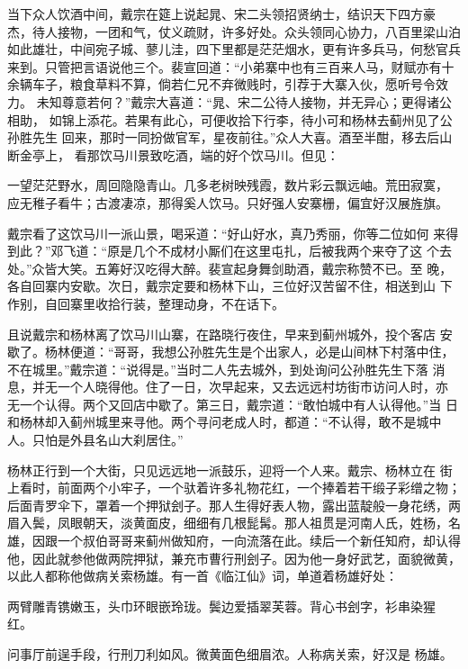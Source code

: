 当下众人饮酒中间，戴宗在筵上说起晁、宋二头领招贤纳士，结识天下四方豪
杰，待人接物，一团和气，仗义疏财，许多好处。众头领同心协力，八百里梁山泊
如此雄壮，中间宛子城、蓼儿洼，四下里都是茫茫烟水，更有许多兵马，何愁官兵
来到。只管把言语说他三个。裴宣回道：“小弟寨中也有三百来人马，财赋亦有十
余辆车子，粮食草料不算，倘若仁兄不弃微贱时，引荐于大寨入伙，愿听号令效力。
未知尊意若何？”戴宗大喜道：“晁、宋二公待人接物，并无异心；更得诸公相助，
如锦上添花。若果有此心，可便收拾下行李，待小可和杨林去蓟州见了公孙胜先生
回来，那时一同扮做官军，星夜前往。”众人大喜。酒至半酣，移去后山断金亭上，
看那饮马川景致吃酒，端的好个饮马川。但见：

一望茫茫野水，周回隐隐青山。几多老树映残霞，数片彩云飘远岫。荒田寂寞，
应无稚子看牛；古渡凄凉，那得奚人饮马。只好强人安寨栅，偏宜好汉展旌旗。

戴宗看了这饮马川一派山景，喝采道：“好山好水，真乃秀丽，你等二位如何
来得到此？”邓飞道：“原是几个不成材小厮们在这里屯扎，后被我两个来夺了这
个去处。”众皆大笑。五筹好汉吃得大醉。裴宣起身舞剑助酒，戴宗称赞不已。至
晚，各自回寨内安歇。次日，戴宗定要和杨林下山，三位好汉苦留不住，相送到山
下作别，自回寨里收拾行装，整理动身，不在话下。

且说戴宗和杨林离了饮马川山寨，在路晓行夜住，早来到蓟州城外，投个客店
安歇了。杨林便道：“哥哥，我想公孙胜先生是个出家人，必是山间林下村落中住，
不在城里。”戴宗道：“说得是。”当时二人先去城外，到处询问公孙胜先生下落
消息，并无一个人晓得他。住了一日，次早起来，又去远远村坊街市访问人时，亦
无一个认得。两个又回店中歇了。第三日，戴宗道：“敢怕城中有人认得他。”当
日和杨林却入蓟州城里来寻他。两个寻问老成人时，都道：“不认得，敢不是城中
人。只怕是外县名山大刹居住。”

杨林正行到一个大街，只见远远地一派鼓乐，迎将一个人来。戴宗、杨林立在
街上看时，前面两个小牢子，一个驮着许多礼物花红，一个捧着若干缎子彩缯之物；
后面青罗伞下，罩着一个押狱刽子。那人生得好表人物，露出蓝靛般一身花绣，两
眉入鬓，凤眼朝天，淡黄面皮，细细有几根髭髯。那人祖贯是河南人氏，姓杨，名
雄，因跟一个叔伯哥哥来蓟州做知府，一向流落在此。续后一个新任知府，却认得
他，因此就参他做两院押狱，兼充市曹行刑刽子。因为他一身好武艺，面貌微黄，
以此人都称他做病关索杨雄。有一首《临江仙》词，单道着杨雄好处：

两臂雕青镌嫩玉，头巾环眼嵌玲珑。鬓边爱插翠芙蓉。背心书刽字，衫串染猩
红。

问事厅前逞手段，行刑刀利如风。微黄面色细眉浓。人称病关索，好汉是
杨雄。

